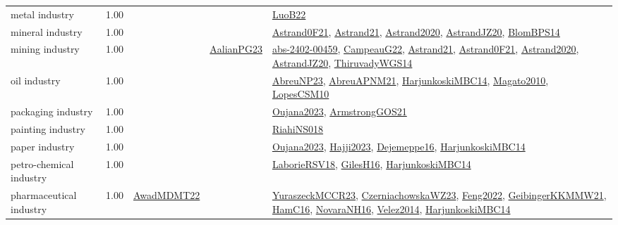 {\begin{longtable}{p{3cm}r>{\raggedright\arraybackslash}p{6cm}>{\raggedright\arraybackslash}p{6cm}>{\raggedright\arraybackslash}p{8cm}}
\index{metal industry}\index{Industries!metal industry}metal industry &  1.00 &  &  & \hyperref[detail:LuoB22]{LuoB22}\\
\index{mineral industry}\index{Industries!mineral industry}mineral industry &  1.00 &  &  & \hyperref[detail:Astrand0F21]{Astrand0F21}, \hyperref[detail:Astrand21]{Astrand21}, \hyperref[detail:Astrand2020]{Astrand2020}, \hyperref[detail:AstrandJZ20]{AstrandJZ20}, \hyperref[detail:BlomBPS14]{BlomBPS14}\\
\index{mining industry}\index{Industries!mining industry}mining industry &  1.00 &  & \hyperref[detail:AalianPG23]{AalianPG23} & \hyperref[detail:abs-2402-00459]{abs-2402-00459}, \hyperref[detail:CampeauG22]{CampeauG22}, \hyperref[detail:Astrand21]{Astrand21}, \hyperref[detail:Astrand0F21]{Astrand0F21}, \hyperref[detail:Astrand2020]{Astrand2020}, \hyperref[detail:AstrandJZ20]{AstrandJZ20}, \hyperref[detail:ThiruvadyWGS14]{ThiruvadyWGS14}\\
\index{oil industry}\index{Industries!oil industry}oil industry &  1.00 &  &  & \hyperref[detail:AbreuNP23]{AbreuNP23}, \hyperref[detail:AbreuAPNM21]{AbreuAPNM21}, \hyperref[detail:HarjunkoskiMBC14]{HarjunkoskiMBC14}, \hyperref[detail:Magato2010]{Magato2010}, \hyperref[detail:LopesCSM10]{LopesCSM10}\\
\index{packaging industry}\index{Industries!packaging industry}packaging industry &  1.00 &  &  & \hyperref[detail:Oujana2023]{Oujana2023}, \hyperref[detail:ArmstrongGOS21]{ArmstrongGOS21}\\
\index{painting industry}\index{Industries!painting industry}painting industry &  1.00 &  &  & \hyperref[detail:RiahiNS018]{RiahiNS018}\\
\index{paper industry}\index{Industries!paper industry}paper industry &  1.00 &  &  & \hyperref[detail:Oujana2023]{Oujana2023}, \hyperref[detail:Hajji2023]{Hajji2023}, \hyperref[detail:Dejemeppe16]{Dejemeppe16}, \hyperref[detail:HarjunkoskiMBC14]{HarjunkoskiMBC14}\\
\index{petro-chemical industry}\index{Industries!petro-chemical industry}petro-chemical industry &  1.00 &  &  & \hyperref[detail:LaborieRSV18]{LaborieRSV18}, \hyperref[detail:GilesH16]{GilesH16}, \hyperref[detail:HarjunkoskiMBC14]{HarjunkoskiMBC14}\\
\index{pharmaceutical industry}\index{Industries!pharmaceutical industry}pharmaceutical industry &  1.00 & \hyperref[detail:AwadMDMT22]{AwadMDMT22} &  & \hyperref[detail:YuraszeckMCCR23]{YuraszeckMCCR23}, \hyperref[detail:CzerniachowskaWZ23]{CzerniachowskaWZ23}, \hyperref[detail:Feng2022]{Feng2022}, \hyperref[detail:GeibingerKKMMW21]{GeibingerKKMMW21}, \hyperref[detail:HamC16]{HamC16}, \hyperref[detail:NovaraNH16]{NovaraNH16}, \hyperref[detail:Velez2014]{Velez2014}, \hyperref[detail:HarjunkoskiMBC14]{HarjunkoskiMBC14}\\

\end{longtable}}
